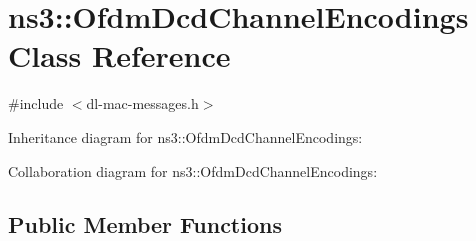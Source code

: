\hypertarget{classns3_1_1OfdmDcdChannelEncodings}{}\section{ns3\+:\+:Ofdm\+Dcd\+Channel\+Encodings Class Reference}
\label{classns3_1_1OfdmDcdChannelEncodings}


{\ttfamily \#include $<$dl-\/mac-\/messages.\+h$>$}



Inheritance diagram for ns3\+:\+:Ofdm\+Dcd\+Channel\+Encodings\+:


Collaboration diagram for ns3\+:\+:Ofdm\+Dcd\+Channel\+Encodings\+:
\subsection*{Public Member Functions}
